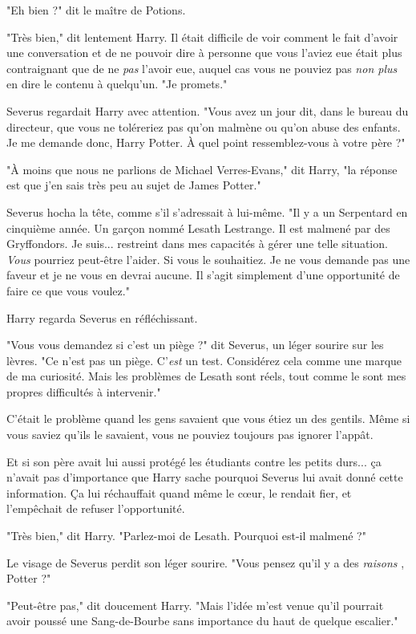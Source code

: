 "Eh bien ?" dit le maître de Potions.

"Très bien," dit lentement Harry. Il était difficile de voir comment le fait d'avoir une conversation et de ne pouvoir dire à personne que vous l'aviez eue était plus contraignant que de ne \emph{pas}  l'avoir eue, auquel cas vous ne pouviez pas \emph{non plus}  en dire le contenu à quelqu'un. "Je promets."

Severus regardait Harry avec attention. "Vous avez un jour dit, dans le bureau du directeur, que vous ne toléreriez pas qu'on malmène ou qu'on abuse des enfants. Je me demande donc, Harry Potter. À quel point ressemblez-vous à votre père ?"

"À moins que nous ne parlions de Michael Verres-Evans," dit Harry, "la réponse est que j'en sais très peu au sujet de James Potter."

Severus hocha la tête, comme s'il s'adressait à lui-même. "Il y a un Serpentard en cinquième année. Un garçon nommé Lesath Lestrange. Il est malmené par des Gryffondors. Je suis... restreint dans mes capacités à gérer une telle situation. \emph{Vous}  pourriez peut-être l'aider. Si vous le souhaitiez. Je ne vous demande pas une faveur et je ne vous en devrai aucune. Il s'agit simplement d'une opportunité de faire ce que vous voulez."

Harry regarda Severus en réfléchissant.

"Vous vous demandez si c'est un piège ?" dit Severus, un léger sourire sur les lèvres. "Ce n'est pas un piège. C'\emph{est}  un test. Considérez cela comme une marque de ma curiosité. Mais les problèmes de Lesath sont réels, tout comme le sont mes propres difficultés à intervenir."

C'était le problème quand les gens savaient que vous étiez un des gentils. Même si vous saviez qu'ils le savaient, vous ne pouviez toujours pas ignorer l'appât.

Et si son père avait lui aussi protégé les étudiants contre les petits durs... ça n'avait pas d'importance que Harry sache pourquoi Severus lui avait donné cette information. Ça lui réchauffait quand même le cœur, le rendait fier, et l'empêchait de refuser l'opportunité.

"Très bien," dit Harry. "Parlez-moi de Lesath. Pourquoi est-il malmené ?"

Le visage de Severus perdit son léger sourire. "Vous pensez qu'il y a des \emph{raisons} , Potter ?"

"Peut-être pas," dit doucement Harry. "Mais l'idée m'est venue qu'il pourrait avoir poussé une Sang-de-Bourbe sans importance du haut de quelque escalier."

